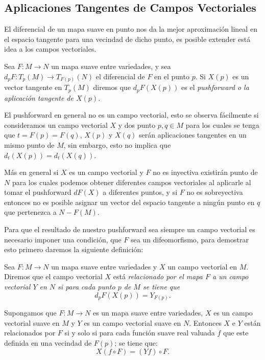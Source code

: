 \subsection{Aplicaciones Tangentes de Campos Vectoriales}\label{Subsección: Pushforward de Campos Vectoriales}

El diferencial de un mapa suave en punto nos da la mejor aproximación lineal en el espacio tangente para una vecindad de dicho punto, es posible extender está idea a los campos vectoriales.

\begin{definition}[Pushforward]
	Sea $F: M \to N$ un mapa suave entre variedades, y sea $d_pF: T_p(M) \to T_{F(p)}(N)$ el diferencial de $F$ en el punto $p$. Si $X(p)$ es un vector tangente en $T_p(M)$ diremos que $d_{p}F(X(p))$ es el \it{pushforward} o la \it{aplicación tangente} de $X(p)$.
\end{definition}

El pushforward en general no es un campo vectorial, esto se observa fácilmente si consideramos un campo vectorial $X$ y dos punto $p,q \in M$ para los cuales se tenga que $t = F(p) = F(q)$, $X(p)$ y $X(q)$ serán aplicaciones tangentes en un mismo punto de $M$, sin embargo, esto no implica que $d_t(X(p)) = d_t(X(q))$.

Más en general si $X$ es un campo vectorial y $F$ no es inyectiva existirán punto de $N$ para los cuales podemos obtener diferentes campos vectoriales al aplicarle al tomar el pushforward $dF(X)$ a diferentes puntos, y si $F$ no es sobreyectiva entonces no es posible asignar un vector del espacio tangente a ningún punto en $q$ que pertenezca a $N - F(M)$.

Para que el resultado de nuestro pushforward sea siempre un campo vectorial es necesario imponer una condición, que $F$ sea un difeomorfismo, para demostrar esto primero daremos la siguiente definición:

\begin{definition}
	Sea $F: M \to N$ un mapa suave entre variedades y $X$ un campo vectorial en $M$. Diremos que el campo vectorial $X$ está \it{relacionado por el mapa $F$} a un campo vectorial $Y$ en $N$ si para cada punto $p$ de $M$ se tiene que
	\[
		d_pF(X(p)) = Y_{F(p)}.
	\]
\end{definition}

\begin{lemma}
	Supongamos que $F: M \to N$ es un mapa suave entre variedades, $X$ es un campo vectorial suave en $M$ y $Y$ es un campo vectorial suave en $N$. Entonces $X$ e $Y$ están relacionados por $F$ si y solo si para cada función suave real valuada $f$ que este definida en una vecindad de $F(p)$; se tiene que:
	\[
		X(f \circ F) = (Yf) \circ F.
	\]
\end{lemma}

